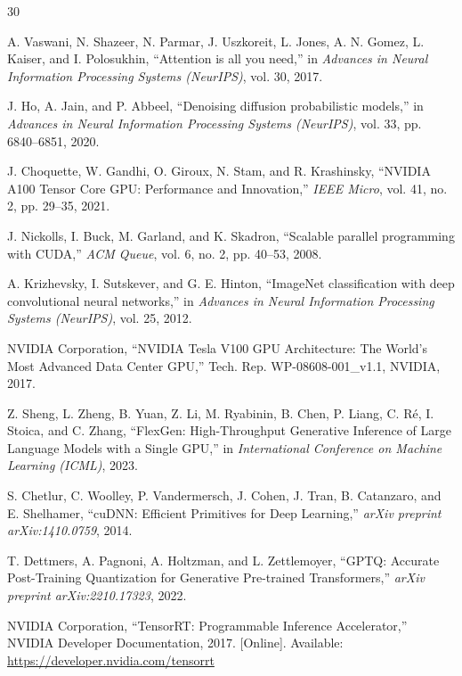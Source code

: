 \documentclass[conference]{IEEEtran}
\begin{document}
\begin{thebibliography}{30}

A. Vaswani, N. Shazeer, N. Parmar, J. Uszkoreit, L. Jones, A. N. Gomez, L. Kaiser, and I. Polosukhin,
``Attention is all you need,''
in \textit{Advances in Neural Information Processing Systems (NeurIPS)}, vol. 30, 2017.

J. Ho, A. Jain, and P. Abbeel,
``Denoising diffusion probabilistic models,''
in \textit{Advances in Neural Information Processing Systems (NeurIPS)}, vol. 33, pp. 6840--6851, 2020.

J. Choquette, W. Gandhi, O. Giroux, N. Stam, and R. Krashinsky,
``NVIDIA A100 Tensor Core GPU: Performance and Innovation,''
\textit{IEEE Micro}, vol. 41, no. 2, pp. 29--35, 2021.

J. Nickolls, I. Buck, M. Garland, and K. Skadron,
``Scalable parallel programming with CUDA,''
\textit{ACM Queue}, vol. 6, no. 2, pp. 40--53, 2008.

A. Krizhevsky, I. Sutskever, and G. E. Hinton,
``ImageNet classification with deep convolutional neural networks,''
in \textit{Advances in Neural Information Processing Systems (NeurIPS)}, vol. 25, 2012.

NVIDIA Corporation,
``NVIDIA Tesla V100 GPU Architecture: The World's Most Advanced Data Center GPU,''
Tech. Rep. WP-08608-001\_v1.1, NVIDIA, 2017.

Z. Sheng, L. Zheng, B. Yuan, Z. Li, M. Ryabinin, B. Chen, P. Liang, C. R\'{e}, I. Stoica, and C. Zhang,
``FlexGen: High-Throughput Generative Inference of Large Language Models with a Single GPU,''
in \textit{International Conference on Machine Learning (ICML)}, 2023.

S. Chetlur, C. Woolley, P. Vandermersch, J. Cohen, J. Tran, B. Catanzaro, and E. Shelhamer,
``cuDNN: Efficient Primitives for Deep Learning,''
\textit{arXiv preprint arXiv:1410.0759}, 2014.

T. Dettmers, A. Pagnoni, A. Holtzman, and L. Zettlemoyer,
``GPTQ: Accurate Post-Training Quantization for Generative Pre-trained Transformers,''
\textit{arXiv preprint arXiv:2210.17323}, 2022.

NVIDIA Corporation,
``TensorRT: Programmable Inference Accelerator,''
NVIDIA Developer Documentation, 2017. [Online]. Available: \url{https://developer.nvidia.com/tensorrt}


\end{thebibliography}
\end{document}
